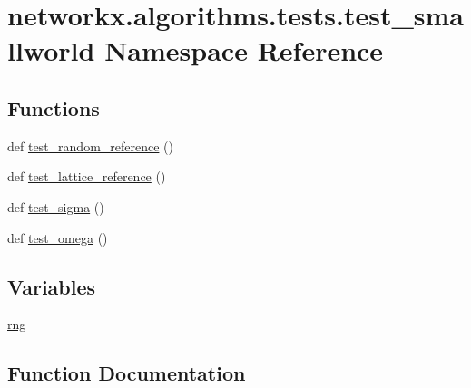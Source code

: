 \hypertarget{namespacenetworkx_1_1algorithms_1_1tests_1_1test__smallworld}{}\section{networkx.\+algorithms.\+tests.\+test\+\_\+smallworld Namespace Reference}
\label{namespacenetworkx_1_1algorithms_1_1tests_1_1test__smallworld}
\subsection*{Functions}
\begin{DoxyCompactItemize}
\item 
def \hyperlink{namespacenetworkx_1_1algorithms_1_1tests_1_1test__smallworld_a57918bcf609a11cc06066b684c408180}{test\+\_\+random\+\_\+reference} ()
\item 
def \hyperlink{namespacenetworkx_1_1algorithms_1_1tests_1_1test__smallworld_afe207fd47dee98fc4587778eba028377}{test\+\_\+lattice\+\_\+reference} ()
\item 
def \hyperlink{namespacenetworkx_1_1algorithms_1_1tests_1_1test__smallworld_a1127f384e6e3a7aa08d050cdd0f71b1a}{test\+\_\+sigma} ()
\item 
def \hyperlink{namespacenetworkx_1_1algorithms_1_1tests_1_1test__smallworld_ab618a707cc4a5a4fdc047e8c5ff7af5b}{test\+\_\+omega} ()
\end{DoxyCompactItemize}
\subsection*{Variables}
\begin{DoxyCompactItemize}
\item 
\hyperlink{namespacenetworkx_1_1algorithms_1_1tests_1_1test__smallworld_ae95511155d49d0bb3fb0501895239393}{rng}
\end{DoxyCompactItemize}


\subsection{Function Documentation}
\mbox{\label{namespacenetworkx_1_1algorithms_1_1tests_1_1test__smallworld_afe207fd47dee98fc4587778eba028377}} 
